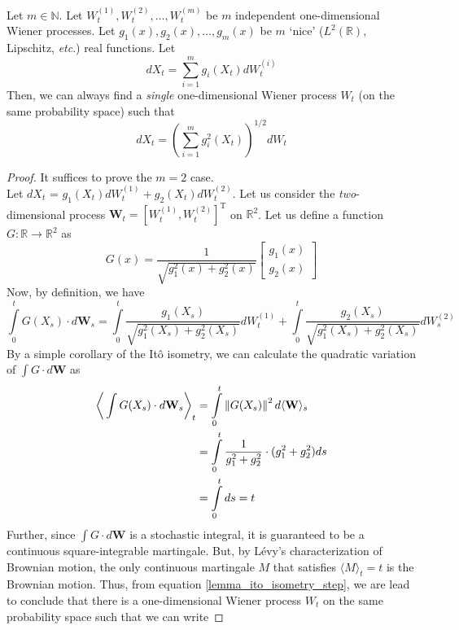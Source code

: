 \begin{lemma}
Let $m \in \mathbb{N}$. Let $W^{(1)}_t, W^{(2)}_t, \ldots, W^{(m)}_t$ be $m$ independent one-dimensional Wiener processes. Let $g_1(x), g_2(x), \ldots, g_m(x)$ be $m$ `nice' ($L^2(\mathbb{R})$, Lipschitz, \emph{etc}.) real functions. Let
\begin{equation*}
	dX_t = \sum\limits_{i=1}^{m} g_i(X_t)dW^{(i)}_t
\end{equation*}
Then, we can always find a \emph{single} one-dimensional Wiener process $W_t$ (on the same probability space) such that
\begin{equation*}
	dX_t = \left(\sum\limits_{i=1}^{m} g^2_i(X_t)\right)^{1/2}dW_t
\end{equation*}
\end{lemma}
\begin{proof}
It suffices to prove the $m=2$ case.\\
Let $dX_t$ = $g_1(X_t) dW^{(1)}_t + g_2(X_t)dW^{(2)}_t$. Let us consider the \emph{two}-dimensional process $\mathbf{W}_t = [W^{(1)}_t, W^{(2)}_t]^{\mathrm{T}}$ on $\mathbb{R}^2$. Let us define a function $G:\mathbb{R} \to \mathbb{R}^2$ as
\begin{equation}
\label{lemma_G_defn}
G(x) = \frac{1}{\sqrt{g_1^2(x) + g_2^2(x)}}\begin{bmatrix}g_1(x) \\ g_2(x)\end{bmatrix}
\end{equation}
Now, by definition, we have
\begin{equation}
	\label{lemma_G_integral}
\int\limits_{0}^{t}G(X_s) \cdot d\mathbf{W}_s = \int\limits_{0}^{t}\frac{g_1(X_s)}{\sqrt{g_1^2(X_s) + g_2^2(X_s)}} dW^{(1)}_t + \int\limits_{0}^{t}\frac{g_2(X_s)}{\sqrt{g_1^2(X_s) + g_2^2(X_s)}}dW^{(2)}_s
\end{equation}
By a simple corollary of the It\^o isometry, we can calculate the quadratic variation of $\int G \cdot d\mathbf{W}$ as
\begin{align}
\bigg\langle \int\limits G(X_s) \cdot d\mathbf{W}_s \bigg\rangle_t &= \int\limits_{0}^{t} \left\lVert G(X_s) \right\rVert^2 d \langle \mathbf{W} \rangle_s \nonumber\\
&= \int\limits_{0}^{t}  \frac{1}{g_1^2 + g_2^2} \cdot (g_1^2 + g_2^2) ds\nonumber\\
&= \int\limits_{0}^{t} ds  = t \label{lemma_ito_isometry_step}
\end{align}
Further, since $\int G \cdot d\mathbf{W}$ is a stochastic integral, it is guaranteed to be a continuous square-integrable martingale.  But, by L\'evy's characterization of Brownian motion, the only continuous martingale $M$ that satisfies $\langle M \rangle_t = t$ is the Brownian motion. Thus, from equation \eqref{lemma_ito_isometry_step}, we are lead to conclude that there is a one-dimensional Wiener process $W_t$ on the same probability space such that we can write

\end{proof}
